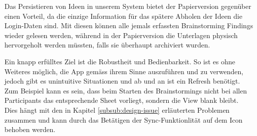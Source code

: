 Das Persistieren von Ideen in unserem System bietet der Papierversion gegenüber einen Vorteil, da die einzige Information für das spätere Abholen der Ideen die Login-Daten sind. Mit diesen können alle jemals erfassten Brainstorming Findings wieder gelesen werden, während in der Papierversion die Unterlagen physisch hervorgeholt werden müssten, falls sie überhaupt archiviert wurden.  

Ein knapp erfülltes Ziel ist die Robustheit und Bedienbarkeit. So ist es ohne Weiteres möglich, die App gemäss ihrem Sinne auszuführen und zu verwenden, jedoch gibt es unintuitive Situationen und ab und an ist ein Refresh benötigt. Zum Beispiel kann es sein, dass beim Starten des Brainstormings nicht bei allen Participants das entsprechende Sheet vorliegt, sondern die View blank bleibt. Dies hängt mit den in Kapitel \ref{subsub:design-issue} erläuterten Problemen zusammen und kann durch das Betätigen der Sync-Funktionlität auf dem Icon behoben werden. 
